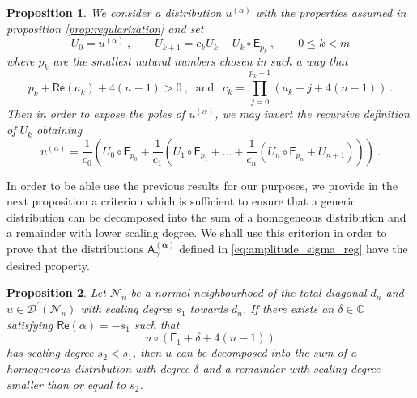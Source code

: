 \documentclass[11pt]{book}
\renewcommand{\Re}{\mathsf{Re}}
\newcommand{\alphabd}{\boldsymbol{\alpha}}
\newcommand{\Dcal}{\mathcal{D}}
\newcommand{\Ncal}{\mathcal{N}}
\newcommand{\Cbb}{\mathbb{C}}
\newcommand{\Asf}{\mathsf{A}}
\newcommand{\Esf}{\mathsf{E}}
\theoremstyle{break}
\newtheorem{proposition}{Proposition}
\begin{document}
\begin{proposition}\label{prop:expose_poles}
We consider a distribution $u^{(\alpha)}$ with the properties assumed in proposition \ref{prop:regularization} and set
%
\begin{equation*}
U_0 = u^{(\alpha)} \ , \qquad U_{k+1} = c_k U_k - U_k \circ \Esf_{p_k} \ , \qquad 0 \leq k < m 
\end{equation*}
%
where $p_k$ are the smallest natural numbers chosen in such a way that 
%
\begin{equation*}
p_k+\Re(a_k)+4(n-1)>0 \ , \ \mbox{ and } \ \ c_k = \prod_{j=0}^{p_k-1} \left(a_k+j+4(n-1)\right) \ .
\end{equation*}
%
Then in order to expose the poles of $u^{(\alpha)}$, we may invert the recursive definition of $U_k$ obtaining
%
\begin{equation*}
u^{(\alpha)} = \frac{1}{c_0} \left( U_0\circ \Esf_{p_0} +  \frac{1}{c_1} \left( U_1 \circ \Esf_{p_1} +\dots + \frac{1}{c_n} \left( U_n \circ \Esf_{p_n} + U_{n+1} \right) \right) \right) \ .
\end{equation*}
%
\end{proposition}


In order to be able use the previous results for our purposes, we provide in the next proposition a criterion which is sufficient to ensure that a generic distribution can be decomposed into the sum of a homogeneous distribution and a remainder with lower scaling degree. We shall use this criterion in order to prove that the distributions $\Asf_\gamma^{(\alphabd)}$ defined in \eqref{eq:amplitude_sigma_reg} have the desired property.


\begin{proposition}\label{prop:set}
Let $\Ncal_n$ be a normal neighbourhood of the total diagonal $d_n$ and $u \in \Dcal^\prime(\Ncal_n)$ with scaling degree $s_1$ towards $d_n$. If there exists an $\delta\in\Cbb$ satisfying $\Re(\alpha)=-s_1$ such that
%
\begin{equation*}
u\circ(\Esf_1+\delta+4(n-1)) 
\end{equation*}
%
has scaling degree $s_2 < s_1$, then $u$ can be decomposed into the sum of a homogeneous distribution with degree $\delta$ and a remainder with scaling degree smaller than or equal to $s_2$.
\end{proposition}
\end{document}
